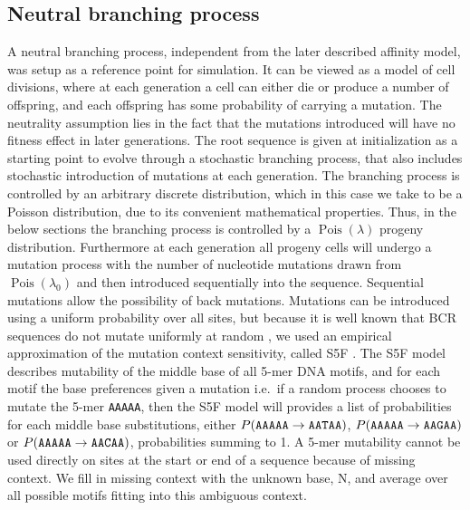 \subsection{Neutral branching process}
A neutral branching process, independent from the later described affinity model, was setup as a reference point for simulation.
It can be viewed as a model of cell divisions, where at each generation a cell can either die or produce a number of offspring, and each offspring has some probability of carrying a mutation.
The neutrality assumption lies in the fact that the mutations introduced will have no fitness effect in later generations.
The root sequence is given at initialization as a starting point to evolve through a stochastic branching process, that also includes stochastic introduction of mutations at each generation.
The branching process is controlled by an arbitrary discrete distribution, which in this case we take to be a Poisson distribution, due to its convenient mathematical properties.
Thus, in the below sections the branching process is controlled by a $\operatorname{Pois}(\lambda)$ progeny distribution.
Furthermore at each generation all progeny cells will undergo a mutation process with the number of nucleotide mutations drawn from $\operatorname{Pois}(\lambda_0)$ and then introduced sequentially into the sequence.
Sequential mutations allow the possibility of back mutations.
Mutations can be introduced using a uniform probability over all sites, but because it is well known that BCR sequences do not mutate uniformly at random \cite{Yeap2015-nl}, we used an empirical approximation of the mutation context sensitivity, called S5F \cite{cui2016model}.
The S5F model describes mutability of the middle base of all 5-mer DNA motifs, and for each motif the base preferences given a mutation i.e.\ if a random process chooses to mutate the 5-mer \texttt{AAAAA}, then the S5F model will provides a list of probabilities for each middle base substitutions, either $P(\text{\texttt{AAAAA}} \rightarrow \text{\texttt{AATAA}})$, $P(\text{\texttt{AAAAA}} \rightarrow \text{\texttt{AAGAA}})$ or $P(\text{\texttt{AAAAA}} \rightarrow \text{\texttt{AACAA}})$, probabilities summing to 1.
A 5-mer mutability cannot be used directly on sites at the start or end of a sequence because of missing context.
We fill in missing context with the unknown base, N, and average over all possible motifs fitting into this ambiguous context.

